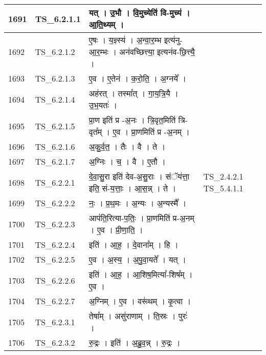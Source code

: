 \documentclass[17pt]{extarticle}
\begin{document}
\begin{longtable}{||p{0.4in}||p{0.9in}||p{4.0in}||p{0.9in}||}
        \hline
            1691 & TS\_6.2.1.1 & यत्   ।   उ॒भौ   ।   वि॒मुच्येति॑ वि{-}मुच्य॑   ।   आ॒ति॒थ्यम्   ।    &      \\
        \hline
            1692 & TS\_6.2.1.2 & ए॒षः   ।   य॒ज्ञ्स्य॑   ।   अ॒न्वा॒र॒म्भ इत्य॑नु{-} आ॒र॒म्भः   ।   अन॑वच्छित्त्या॒ इत्यन॑व{-}छि॒त्त्यै॒   ।    &      \\
        \hline
            1693 & TS\_6.2.1.3 & ए॒व   ।   ए॒तेन॑   ।   क॒रो॒ति॒   ।   अ॒ग्नये᳚   ।    &      \\
        \hline
            1694 & TS\_6.2.1.4 & अह॑रत्   ।   तस्मा᳚त्   ।   गा॒य॒त्रि॒यै   ।   उ॒भ॒यतः॑   ।    &      \\
        \hline
            1695 & TS\_6.2.1.5 & प्रा॒ण इति॑ प्र {-}अ॒नः   ।   त्रि॒वृत॒मिति॑ त्रि{-}वृत᳚म्   ।   ए॒व   ।   प्रा॒णमिति॑ प्र {-}अ॒नम्   ।    &      \\
        \hline
            1696 & TS\_6.2.1.6 & अ॒कु॒र्व॒त॒   ।   तैः   ।   वै   ।   ते   ।    &      \\
        \hline
            1697 & TS\_6.2.1.7 & अ॒ग्निः   ।   च॒   ।   वै   ।   ए॒तौ   ।    &      \\
        \hline
            1698 & TS\_6.2.2.1 & दे॒वा॒सु॒रा इति॑ देव{-}अ॒सु॒राः   ।   संॅय॑त्ता॒ इति॒ सं{-}य॒त्ताः॒   ।   आ॒स॒न्न्   ।   ते   ।    & TS\_2.4.2.1 TS\_5.4.1.1        \\
        \hline
            1699 & TS\_6.2.2.2 & नः॒   ।   प्र॒थ॒मः   ।   अ॒न्यः   ।   अ॒न्यस्मै᳚   ।    &      \\
        \hline
            1700 & TS\_6.2.2.3 & आप॑ति॒रित्या{-}प॒तिः॒   ।   प्रा॒णमिति॑ प्र{-}अ॒नम्   ।   ए॒व   ।   प्री॒णा॒ति॒   ।    &      \\
        \hline
            1701 & TS\_6.2.2.4 & इति॑   ।   आ॒ह॒   ।   दे॒वाना᳚म्   ।   हि   ।    &      \\
        \hline
            1702 & TS\_6.2.2.5 & ए॒व   ।   अ॒स्य॒   ।   अ॒पु॒वा॒यते᳚   ।   यत्   ।    &      \\
        \hline
            1703 & TS\_6.2.2.6 & इति॑   ।   आ॒ह॒   ।   आ॒शिष॒मित्या᳚{-}शिष᳚म्   ।   ए॒व   ।    &      \\
        \hline
            1704 & TS\_6.2.2.7 & अ॒ग्निम्   ।   ए॒व   ।   वरू॑थम्   ।   कृ॒त्वा   ।    &      \\
        \hline
            1705 & TS\_6.2.3.1 & तेषा᳚म्   ।   असु॑राणाम्   ।   ति॒स्रः   ।   पुरः॑   ।    &      \\
        \hline
            1706 & TS\_6.2.3.2 & रु॒द्रः   ।   इति॑   ।   अ॒ब्रु॒व॒न्न्   ।   रु॒द्रः   ।    &      \\

\end{longtable}
\end{document}
